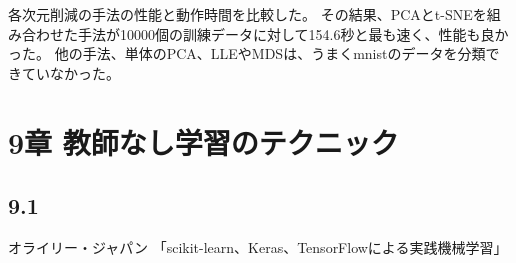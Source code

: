 \documentclass[a4j,twocolumn]{jsarticle}
\begin{document}
各次元削減の手法の性能と動作時間を比較した。
その結果、PCAとt-SNEを組み合わせた手法が10000個の訓練データに対して154.6秒と最も速く、性能も良かった。
他の手法、単体のPCA、LLEやMDSは、うまくmnistのデータを分類できていなかった。


\section{9章 教師なし学習のテクニック}
\subsection{9.1}




\begin{thebibliography}{}
オライリー・ジャパン 「scikit-learn、Keras、TensorFlowによる実践機械学習」
\end{thebibliography}
\end{document}
